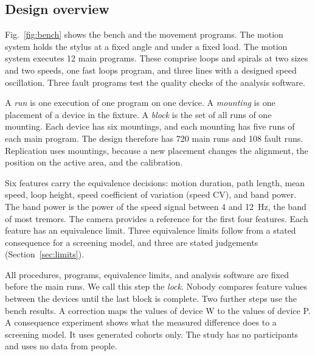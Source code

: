 \subsection{Design overview}
Fig.~\ref{fig:bench} shows the bench and the movement programs.
The motion system holds the stylus at a fixed angle and under a fixed load.
The motion system executes 12 main programs.
These comprise loops and spirals at two sizes and two speeds, one fast loops program, and three lines with a designed speed oscillation.
Three fault programs test the quality checks of the analysis software.

A \emph{run} is one execution of one program on one device.
A \emph{mounting} is one placement of a device in the fixture.
A \emph{block} is the set of all runs of one mounting.
Each device has six mountings, and each mounting has five runs of each main program.
The design therefore has 720 main runs and 108 fault runs.
Replication uses mountings, because a new placement changes the alignment, the position on the active area, and the calibration.

Six features carry the equivalence decisions: motion duration, path length, mean speed, loop height, speed coefficient of variation (speed CV), and band power.
The band power is the power of the speed signal between 4 and 12~Hz, the band of most tremors.
The camera provides a reference for the first four features.
Each feature has an equivalence limit.
Three equivalence limits follow from a stated consequence for a screening model, and three are stated judgements (Section~\ref{sec:limits}).

All procedures, programs, equivalence limits, and analysis software are fixed before the main runs.
We call this step the \emph{lock}.
Nobody compares feature values between the devices until the last block is complete.
Two further steps use the bench results.
A correction maps the values of device W to the values of device P.
A consequence experiment shows what the measured difference does to a screening model.
It uses generated cohorts only.
The study has no participants and uses no data from people.
